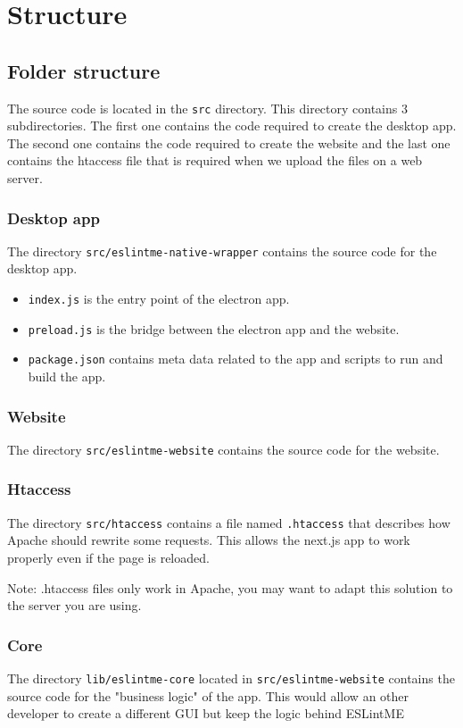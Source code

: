 \section{Structure}
\subsection{Folder structure}
The source code is located in the \verb|src| directory. 
This directory contains 3 subdirectories. 
The first one contains the code required to create the desktop app. 
The second one contains the code required to create the website 
and the last one contains the htaccess file that is required when we upload the files on a web server.

\subsubsection{Desktop app}
The directory \verb|src/eslintme-native-wrapper| contains 
the source code for the desktop app. 

\begin{itemize}
    \item \verb|index.js| is the entry point of the electron app.
    \item \verb|preload.js| is the bridge between the electron app and the website.
    \item \verb|package.json| contains meta data related to the app and scripts to run and build the app.
\end{itemize}

\subsubsection{Website}
The directory \verb|src/eslintme-website| contains 
the source code for the website.
\subsubsection{Htaccess}
The directory \verb|src/htaccess| contains a file named \verb|.htaccess| that 
describes how Apache should rewrite some requests. 
This allows the next.js app to work properly even if the page is reloaded. 

\noindent Note: .htaccess files only work in Apache, 
you may want to adapt this solution to the server you are using.

\subsubsection{Core}
The directory \verb|lib/eslintme-core| located in \verb|src/eslintme-website| contains 
the source code for the "business logic" of the app. This would allow an other developer to create a different GUI but keep the logic behind ESLintME

